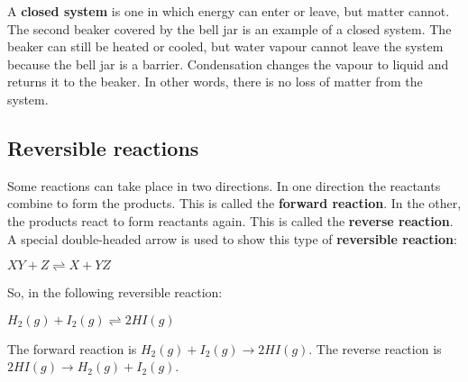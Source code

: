 A \textbf{closed system} is one in which energy can enter or leave, but matter cannot. The second beaker covered by the bell jar is an example of a closed system. The beaker can still be heated or cooled, but water vapour cannot leave the system because the bell jar is a barrier. Condensation changes the vapour to liquid and returns it to the beaker. In other words, there is no loss of matter from the system. \\


\subsection{Reversible reactions}
Some reactions can take place in two directions. In one direction the reactants combine to form the products. This is called the \textbf{forward reaction}. In the other, the products react to form reactants again. This is called the \textbf{reverse reaction}. A special double-headed arrow is used to show this type of \textbf{reversible reaction}:

\begin{center}
$ XY + Z \rightleftharpoons X + YZ $
\end{center}

So, in the following reversible reaction:
\begin{center}
\rm${H_{2}(g) + I_{2}(g) \rightleftharpoons 2HI (g)}$
\end{center}

The forward reaction is ${H_{2}(g) + I_{2}(g) \rightarrow 2HI(g)}$. The reverse reaction is ${2HI(g) \rightarrow H_{2}(g) + I_{2}(g)}$.


